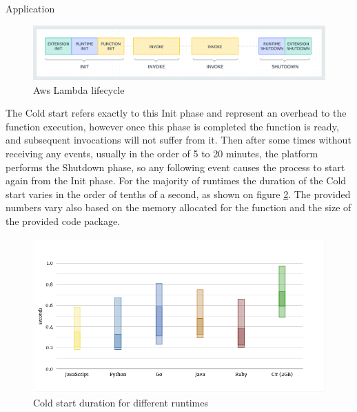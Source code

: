 \begin{chapter}{Application}
    \begin{figure}
        \centering
        \includegraphics[width=\linewidth]{source/images/aws-lambda-lifecycle.png}
        \caption{Aws Lambda lifecycle}
        \label{fig:aws_lambda_lifecycle}
    \end{figure}

    The Cold start refers exactly to this Init phase and represent an overhead to the
    function execution, however once this phase is completed the function is ready,
    and subsequent invocations will not suffer from it. Then after some times without
    receiving any events, usually in the order of 5 to 20 minutes, the platform performs
    the Shutdown phase, so any following event causes the process to start again from
    the Init phase.
    For the majority of runtimes the duration of the Cold start varies in the order
    of tenths of a second, as shown on figure \ref{fig:cold_start_duration}. The provided
    numbers vary also based on the memory allocated for the function and the size of the
    provided code package.

    \begin{figure}
        \centering
        \includegraphics[width=\linewidth]{source/images/cold-start-duration.png}
        \caption{Cold start duration for different runtimes}
        \label{fig:cold_start_duration}
    \end{figure}



\end{chapter}

